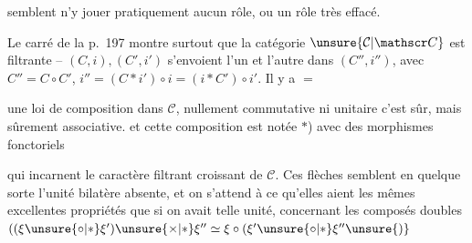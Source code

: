 
semblent n'y jouer pratiquement aucun rôle, ou un rôle très effacé.

Le carré de la p.~197 montre surtout que la catégorie $\unsure{\mathcal C|\mathscr C}$ est filtrante -- $(C,i),(C',i')$ s'envoient l'un et l'autre dans $(C'',i'')$, avec $C''=C\circ C'$,  $i''=(C*i')\circ i=(i*C')\circ i'$. Il y a $=$

une loi de composition dans $\mathcal C$, nullement commutative ni unitaire c'est sûr, mais sûrement associative. et \unsure{(} cette composition est notée $*$) avec des morphismes fonctoriels


qui incarnent le caractère filtrant croissant de $\mathcal C$. Ces flèches semblent  en quelque sorte l'unité bilatère absente, et on s'attend à ce qu'elles aient les mêmes excellentes propriétés que si on avait  telle unité, concernant les composés doubles $((\xi\unsure{\circ|*}\xi')\unsure{\times|*}\xi''\simeq\xi\circ(\xi'\unsure{\circ|*}\xi''\unsure{)}$ \unsure{:}
